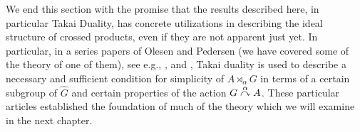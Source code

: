 We end this section with the promise that the results described here, in particular Takai Duality, has concrete utilizations in describing the ideal structure of crossed products, even if they are not apparent just yet. In particular, in a series papers of Olesen and Pedersen (we have covered some of the theory of one of them), see e.g., \cite{olesenpedersen1}, \cite{olesenpedersen2} and \cite{olesenpedersen3}, Takai duality is used to describe a necessary and sufficient condition for simplicity of $A \rtimes_\alpha G$ in terms of a certain subgroup of $\hat G$ and certain properties of the action $G \stackrel{\alpha}{\curvearrowright} A$. These particular articles established the foundation of much of the theory which we will examine in the next chapter.
